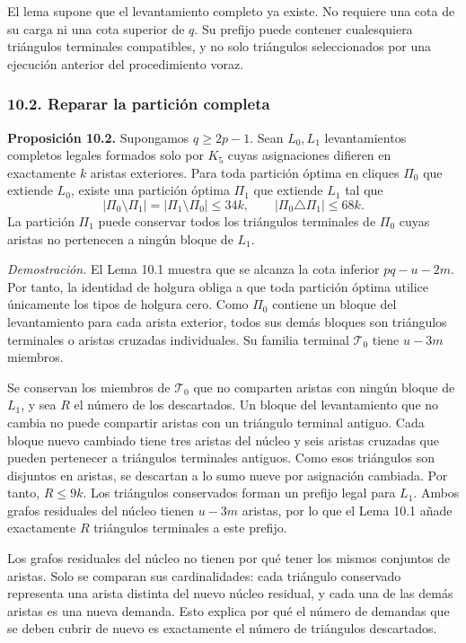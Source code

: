 \documentclass[spanish,11pt,a4paper]{article}
\begin{document}
El lema supone que el levantamiento completo ya existe. No requiere una
cota de su carga ni una cota superior de \(q\). Su prefijo puede
contener cualesquiera triángulos terminales compatibles, y no solo
triángulos seleccionados por una ejecución anterior del procedimiento
voraz.

\subsubsection{10.2. Reparar la partición
completa}\label{reparar-la-particiuxf3n-completa}

\textbf{Proposición 10.2.} Supongamos \(q\ge2p-1\). Sean \(L_0,L_1\)
levantamientos completos legales formados solo por \(K_5\) cuyas
asignaciones difieren en exactamente \(k\) aristas exteriores. Para toda
partición óptima en cliques \(\Pi_0\) que extiende \(L_0\), existe una
partición óptima \(\Pi_1\) que extiende \(L_1\) tal que \[
|\Pi_0\setminus\Pi_1|=|\Pi_1\setminus\Pi_0|\le34k,
\qquad |\Pi_0\triangle\Pi_1|\le68k.
\] La partición \(\Pi_1\) puede conservar todos los triángulos
terminales de \(\Pi_0\) cuyas aristas no pertenecen a ningún bloque de
\(L_1\).

\emph{Demostración.} El Lema 10.1 muestra que se alcanza la cota
inferior \(pq-u-2m\). Por tanto, la identidad de holgura obliga a que
toda partición óptima utilice únicamente los tipos de holgura cero. Como
\(\Pi_0\) contiene un bloque del levantamiento para cada arista
exterior, todos sus demás bloques son triángulos terminales o aristas
cruzadas individuales. Su familia terminal \(\mathcal T_0\) tiene
\(u-3m\) miembros.

Se conservan los miembros de \(\mathcal T_0\) que no comparten aristas
con ningún bloque de \(L_1\), y sea \(R\) el número de los descartados.
Un bloque del levantamiento que no cambia no puede compartir aristas con
un triángulo terminal antiguo. Cada bloque nuevo cambiado tiene tres
aristas del núcleo y seis aristas cruzadas que pueden pertenecer a
triángulos terminales antiguos. Como esos triángulos son disjuntos en
aristas, se descartan a lo sumo nueve por asignación cambiada. Por
tanto, \(R\le9k\). Los triángulos conservados forman un prefijo legal
para \(L_1\). Ambos grafos residuales del núcleo tienen \(u-3m\)
aristas, por lo que el Lema 10.1 añade exactamente \(R\) triángulos
terminales a este prefijo.

Los grafos residuales del núcleo no tienen por qué tener los mismos
conjuntos de aristas. Solo se comparan sus cardinalidades: cada
triángulo conservado representa una arista distinta del nuevo núcleo
residual, y cada una de las demás aristas es una nueva demanda. Esto
explica por qué el número de demandas que se deben cubrir de nuevo es
exactamente el número de triángulos descartados.
\end{document}
